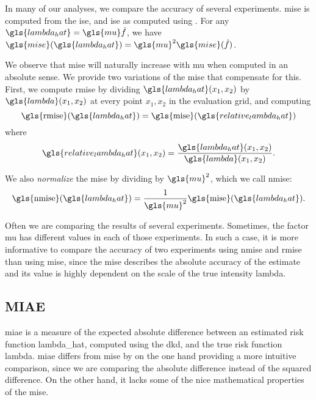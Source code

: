 In many of our analyses, we compare the accuracy of several experiments.
\gls{mise} is computed from the \gls{ise},
and \gls{ise} as computed using .
For any $\gls{lambda_hat} = \gls{mu} \hat f $,
we have $ \gls{mise}(\gls{lambda_hat}) = \gls{mu}^2 \gls{mise}(\hat f) $.

We observe that \gls{mise} will naturally increase with \gls{mu} when computed in an absolute sense.
We provide two variations of the \gls{mise} that compensate for this.
First, we compute \gls{rmise} by dividing $\gls{lambda_hat}\xvec$ by $\gls{lambda}\xvec$ at every point $x_1, x_2$ in the evaluation grid, and computing
\begin{equation}
\label{eq:rmise}
    \mbox{\gls{rmise}}(\gls{lambda_hat}) = 
        \mbox{\gls{mise}}(\gls{relative_lambda_hat}) \\
\end{equation}
where
\begin{equation}
\label{eq:relative_lambda_hat}
    \gls{relative_lambda_hat}\xvec = 
        \frac{\gls{lambda_hat}\xvec}{\gls{lambda}\xvec}
        \text{.}
\end{equation}

We also \textit{normalize} the \gls{mise} by dividing by $\gls{mu}^2$,
which we call \gls{nmise}:
\begin{equation}
\label{eq:nmise}
    \mbox{\gls{nmise}}(\gls{lambda_hat}) = 
        \frac{1}{\gls{mu}^2} \mbox{\gls{mise}}(\gls{lambda_hat}) \text{.}
\end{equation}

Often we are comparing the results of several experiments.
Sometimes, the \gls{factor} \gls{mu} has different values in each of those experiments.
In such a case, it is more informative to compare the accuracy of two experiments using \gls{nmise} and \gls{rmise} than using \gls{mise},
since the \gls{mise} describes the absolute accuracy of the estimate and its value is highly dependent on the scale of the true intensity \gls{lambda}.

\subsection{MIAE}
\label{subsec:method:miae}

\Gls{miae} is a measure of the expected absolute difference between an estimated risk function \gls{lambda_hat},
computed using the \gls{dkd}, and the true risk function \gls{lambda}.
\Gls{miae} differs from \gls{mise} by on the one hand providing a more intuitive comparison,
since we are comparing the absolute difference instead of the squared difference.
On the other hand, it lacks some of the nice mathematical properties of the \gls{mise}.

